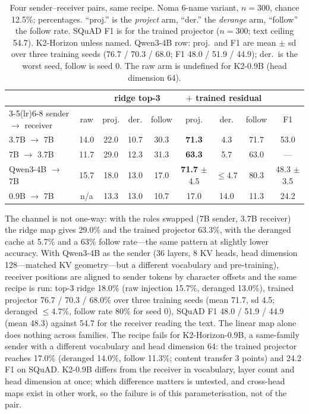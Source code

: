 \documentclass{article}
\begin{document}
\begin{table}[h]
\caption{Four sender--receiver pairs, same recipe. Noma 6-name variant, $n = 300$, chance 12.5\%; percentages. ``proj.'' is the \emph{project} arm, ``der.'' the \emph{derange} arm, ``follow'' the follow rate. SQuAD F1 is for the trained projector ($n = 300$; text ceiling 54.7). K2-Horizon unless named. Qwen3-4B row: proj.\ and F1 are mean $\pm$ sd over three training seeds (76.7 / 70.3 / 68.0; F1 48.0 / 51.9 / 44.9); der.\ is the worst seed, follow is seed 0. The raw arm is undefined for K2-0.9B (head dimension 64).}
\label{tab:pairs}
\vskip 0.1in
\begin{center}
\begin{footnotesize}
\begin{tabular}{lcccccccc}
\toprule
& & \multicolumn{3}{c}{ridge top-3} & \multicolumn{3}{c}{$+$ trained residual} & \\
\cmidrule(lr){3-5}\cmidrule(lr){6-8}
sender $\rightarrow$ receiver & raw & proj. & der. & follow & proj. & der. & follow & F1 \\
\midrule
3.7B $\rightarrow$ 7B    & 14.0 & 22.0 & 10.7 & 30.3 & \textbf{71.3} & 4.3 & 71.7 & 53.0 \\
7B $\rightarrow$ 3.7B    & 11.7 & 29.0 & 12.3 & 31.3 & \textbf{63.3} & 5.7 & 63.0 & --- \\
Qwen3-4B $\rightarrow$ 7B & 15.7 & 18.0 & 13.0 & 17.0 & \textbf{71.7} $\pm$ 4.5 & $\le 4.7$ & 80.3 & 48.3 $\pm$ 3.5 \\
0.9B $\rightarrow$ 7B    & n/a  & 13.3 & 13.0 & 10.7 & 17.0 & 14.0 & 11.3 & 24.2 \\
\bottomrule
\end{tabular}
\end{footnotesize}
\end{center}
\end{table}



The channel is not one-way: with the roles swapped (7B sender, 3.7B receiver) the ridge map gives 29.0\% and the trained projector 63.3\%, with the deranged cache at 5.7\% and a 63\% follow rate---the same pattern at slightly lower accuracy. With Qwen3-4B as the sender (36 layers, 8 KV heads, head dimension 128---matched KV geometry---but a different vocabulary and pre-training), receiver positions are aligned to sender tokens by character offsets and the same recipe is run: top-3 ridge 18.0\% (raw injection 15.7\%, deranged 13.0\%), trained projector 76.7 / 70.3 / 68.0\% over three training seeds (mean 71.7, sd 4.5; deranged $\le 4.7\%$, follow rate 80\% for seed 0), SQuAD F1 48.0 / 51.9 / 44.9 (mean 48.3) against 54.7 for the receiver reading the text. The linear map alone does nothing across families. The recipe fails for K2-Horizon-0.9B, a same-family sender with a different vocabulary and head dimension 64: the trained projector reaches 17.0\% (deranged 14.0\%, follow 11.3\%; content transfer 3 points) and 24.2 F1 on SQuAD. K2-0.9B differs from the receiver in vocabulary, layer count and head dimension at once; which difference matters is untested, and cross-head maps exist in other work, so the failure is of this parameterisation, not of the pair.
\end{document}
